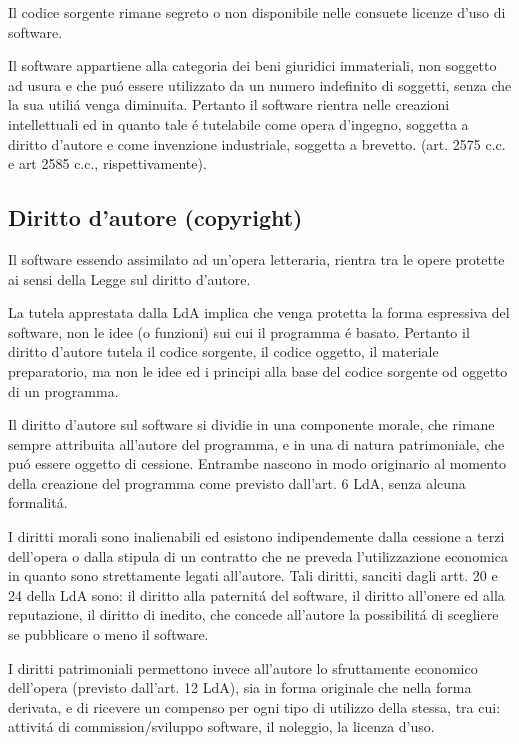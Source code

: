 \documentclass{article}
\begin{document}
Il codice sorgente rimane segreto o non disponibile nelle consuete licenze d'uso di software. 

Il software appartiene alla categoria dei beni giuridici immateriali, non soggetto ad usura e che pu\'o essere utilizzato da un numero indefinito di soggetti, senza che la sua utili\'a venga diminuita. Pertanto il software rientra nelle creazioni intellettuali ed in quanto tale \'e tutelabile come opera d'ingegno, soggetta a diritto d'autore e come invenzione industriale, soggetta a brevetto. (art. 2575 c.c. e art 2585 c.c., rispettivamente). 

\subsection{Diritto d'autore (copyright)}
Il software essendo assimilato ad un'opera letteraria, rientra tra le opere protette ai sensi della Legge sul diritto d'autore. 

La tutela apprestata dalla LdA implica che venga protetta la forma espressiva del software, non le idee (o funzioni) sui cui il programma \'e basato. Pertanto il diritto d'autore tutela il codice sorgente, il codice oggetto, il materiale preparatorio, ma non le idee ed i principi alla base del codice sorgente od oggetto di un programma.

Il diritto d'autore sul software si dividie in una componente morale, che rimane sempre attribuita all'autore del programma, e in una di natura patrimoniale, che pu\'o essere oggetto di cessione. Entrambe nascono in modo originario al momento della creazione del programma come previsto dall'art. 6 LdA, senza alcuna formalit\'a. 

I diritti morali sono inalienabili ed esistono indipendemente dalla cessione a terzi dell'opera o dalla stipula di un contratto che ne preveda l'utilizzazione economica in quanto sono strettamente legati all'autore. Tali diritti, sanciti dagli artt. 20 e 24 della LdA sono: il diritto alla paternit\'a del software, il diritto all'onere ed alla reputazione, il diritto di inedito, che concede all'autore la possibilit\'a di scegliere se pubblicare o meno il software.

I diritti patrimoniali permettono invece all'autore lo sfruttamente economico dell'opera (previsto dall'art. 12 LdA), sia in forma originale che nella forma derivata, e di ricevere un compenso per ogni tipo di utilizzo della stessa, tra cui: attivit\'a di commission/sviluppo software, il noleggio, la licenza d'uso.
\end{document}
